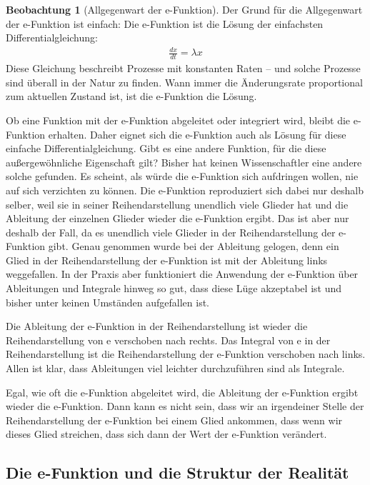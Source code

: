 ﻿\documentclass[a4paper,12pt]{report}
\theoremstyle{definition}
\newtheorem{beobachtung}{Beobachtung}
\begin{document}
	\begin{beobachtung}[Allgegenwart der e-Funktion]
		Der Grund für die Allgegenwart der e-Funktion ist einfach: Die e-Funktion ist die Lösung der einfachsten Differentialgleichung:
		\begin{align}
			\frac{dx}{dt} = \lambda x
		\end{align}
		Diese Gleichung beschreibt Prozesse mit konstanten Raten -- und solche Prozesse sind überall in der Natur zu finden. Wann immer die Änderungsrate proportional zum aktuellen Zustand ist, ist die e-Funktion die Lösung.
		
		Ob eine Funktion mit der e-Funktion abgeleitet oder integriert wird, bleibt die e-Funktion erhalten. Daher eignet sich die e-Funktion auch als Lösung für diese einfache Differentialgleichung. Gibt es eine andere Funktion, für die diese außergewöhnliche Eigenschaft gilt? Bisher hat keinen Wissenschaftler eine andere solche gefunden. Es scheint, als würde die e-Funktion sich aufdringen wollen, nie auf sich verzichten zu können. Die e-Funktion reproduziert sich dabei nur deshalb selber, weil sie in seiner Reihendarstellung unendlich viele Glieder hat und die Ableitung der einzelnen Glieder wieder die e-Funktion ergibt. Das ist aber nur deshalb der Fall, da es unendlich viele Glieder in der Reihendarstellung der e-Funktion gibt. Genau genommen wurde bei der Ableitung gelogen, denn ein Glied in der Reihendarstellung der e-Funktion ist mit der Ableitung links weggefallen. In der Praxis aber funktioniert die Anwendung der e-Funktion über Ableitungen und Integrale hinweg so gut, dass diese Lüge akzeptabel ist und bisher unter keinen Umständen aufgefallen ist.
		
		Die Ableitung der e-Funktion in der Reihendarstellung ist wieder die Reihendarstellung von e verschoben nach rechts. Das Integral von e in der Reihendarstellung ist die Reihendarstellung der e-Funktion verschoben nach links. Allen ist klar, dass Ableitungen viel leichter durchzuführen sind als Integrale.
		
		Egal, wie oft die e-Funktion abgeleitet wird, die Ableitung der e-Funktion ergibt wieder die e-Funktion. Dann kann es nicht sein, dass wir an irgendeiner Stelle der Reihendarstellung der e-Funktion bei einem Glied ankommen, dass wenn wir dieses Glied streichen, dass sich dann der Wert der e-Funktion verändert.
	\end{beobachtung}
	
	\subsection{Die e-Funktion und die Struktur der Realität}
	
\end{document}
